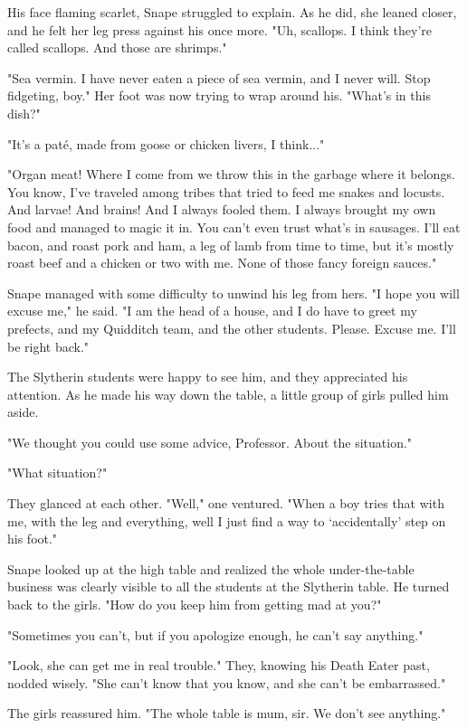 His face flaming scarlet, Snape struggled to explain. As he did, she leaned closer, and he felt her leg press against his once more. "Uh, scallops. I think they're called scallops. And those are shrimps."

"Sea vermin. I have never eaten a piece of sea vermin, and I never will. Stop fidgeting, boy." Her foot was now trying to wrap around his. "What's in this dish?"

"It's a paté, made from goose or chicken livers, I think..."

"Organ meat! Where I come from we throw this in the garbage where it belongs. You know, I've traveled among tribes that tried to feed me snakes and locusts. And larvae! And brains! And I always fooled them. I always brought my own food and managed to magic it in. You can't even trust what's in sausages. I'll eat bacon, and roast pork and ham, a leg of lamb from time to time, but it's mostly roast beef and a chicken or two with me. None of those fancy foreign sauces."

Snape managed with some difficulty to unwind his leg from hers. "I hope you will excuse me," he said. "I am the head of a house, and I do have to greet my prefects, and my Quidditch team, and the other students. Please. Excuse me. I'll be right back."

The Slytherin students were happy to see him, and they appreciated his attention. As he made his way down the table, a little group of girls pulled him aside.

"We thought you could use some advice, Professor. About the situation."

"What situation?"

They glanced at each other. "Well," one ventured. "When a boy tries that with me, with the leg and everything, well I just find a way to `accidentally' step on his foot."

Snape looked up at the high table and realized the whole under-the-table business was clearly visible to all the students at the Slytherin table. He turned back to the girls. "How do you keep him from getting mad at you?"

"Sometimes you can't, but if you apologize enough, he can't say anything."

"Look, she can get me in real trouble." They, knowing his Death Eater past, nodded wisely. "She can't know that you know, and she can't be embarrassed."

The girls reassured him. "The whole table is mum, sir. We don't see anything."

